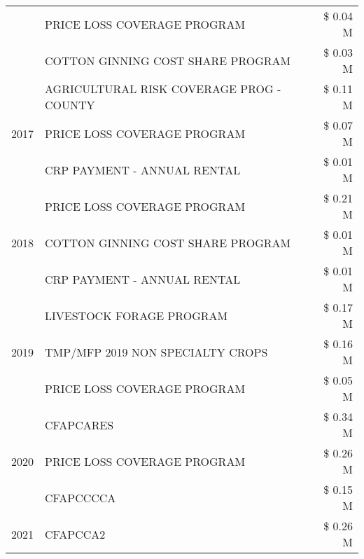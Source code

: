 \begin{tabular}{llr}
 & PRICE LOSS COVERAGE PROGRAM & \$ 0.04 M \\
 & COTTON GINNING COST SHARE PROGRAM & \$ 0.03 M \\
\cline{1-3}
\multirow[t]{3}{*}{2017} & AGRICULTURAL RISK COVERAGE PROG - COUNTY & \$ 0.11 M \\
 & PRICE LOSS COVERAGE PROGRAM & \$ 0.07 M \\
 & CRP PAYMENT - ANNUAL RENTAL & \$ 0.01 M \\
\cline{1-3}
\multirow[t]{3}{*}{2018} & PRICE LOSS COVERAGE PROGRAM & \$ 0.21 M \\
 & COTTON GINNING COST SHARE PROGRAM & \$ 0.01 M \\
 & CRP PAYMENT - ANNUAL RENTAL & \$ 0.01 M \\
\cline{1-3}
\multirow[t]{3}{*}{2019} & LIVESTOCK FORAGE PROGRAM & \$ 0.17 M \\
 & TMP/MFP 2019 NON SPECIALTY CROPS & \$ 0.16 M \\
 & PRICE LOSS COVERAGE PROGRAM & \$ 0.05 M \\
\cline{1-3}
\multirow[t]{3}{*}{2020} & CFAPCARES & \$ 0.34 M \\
 & PRICE LOSS COVERAGE PROGRAM & \$ 0.26 M \\
 & CFAPCCCCA & \$ 0.15 M \\
\cline{1-3}
2021 & CFAPCCA2 & \$ 0.26 M \\
\cline{1-3}
\bottomrule
\end{tabular}
